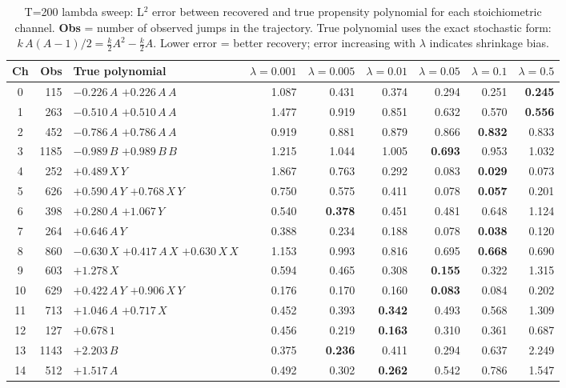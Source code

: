 \begin{table}[htbp]
\centering
\small
\caption{T=200 lambda sweep: L$^2$ error between recovered and true propensity polynomial
for each stoichiometric channel. \textbf{Obs} = number of observed jumps in the trajectory.
True polynomial uses the exact stochastic form: $k\,A(A-1)/2 = \tfrac{k}{2}A^2 - \tfrac{k}{2}A$.
Lower error = better recovery; error increasing with $\lambda$ indicates shrinkage bias.}
\label{tab:sparse_lambda_sweep}
\begin{tabular}{c r l r r r r r r }
\toprule
Ch & Obs & True polynomial & $\lambda=0.001$ & $\lambda=0.005$ & $\lambda=0.01$ & $\lambda=0.05$ & $\lambda=0.1$ & $\lambda=0.5$ \\
\midrule
0 & 115 & $-0.226\,A$ $+0.226\,A\,A$ & 1.087 & 0.431 & 0.374 & 0.294 & 0.251 & \textbf{0.245} \\
1 & 263 & $-0.510\,A$ $+0.510\,A\,A$ & 1.477 & 0.919 & 0.851 & 0.632 & 0.570 & \textbf{0.556} \\
2 & 452 & $-0.786\,A$ $+0.786\,A\,A$ & 0.919 & 0.881 & 0.879 & 0.866 & \textbf{0.832} & 0.833 \\
3 & 1185 & $-0.989\,B$ $+0.989\,B\,B$ & 1.215 & 1.044 & 1.005 & \textbf{0.693} & 0.953 & 1.032 \\
4 & 252 & $+0.489\,X\,Y$ & 1.867 & 0.763 & 0.292 & 0.083 & \textbf{0.029} & 0.073 \\
5 & 626 & $+0.590\,A\,Y$ $+0.768\,X\,Y$ & 0.750 & 0.575 & 0.411 & 0.078 & \textbf{0.057} & 0.201 \\
6 & 398 & $+0.280\,A$ $+1.067\,Y$ & 0.540 & \textbf{0.378} & 0.451 & 0.481 & 0.648 & 1.124 \\
7 & 264 & $+0.646\,A\,Y$ & 0.388 & 0.234 & 0.188 & 0.078 & \textbf{0.038} & 0.120 \\
8 & 860 & $-0.630\,X$ $+0.417\,A\,X$ $+0.630\,X\,X$ & 1.153 & 0.993 & 0.816 & 0.695 & \textbf{0.668} & 0.690 \\
9 & 603 & $+1.278\,X$ & 0.594 & 0.465 & 0.308 & \textbf{0.155} & 0.322 & 1.315 \\
10 & 629 & $+0.422\,A\,Y$ $+0.906\,X\,Y$ & 0.176 & 0.170 & 0.160 & \textbf{0.083} & 0.084 & 0.202 \\
11 & 713 & $+1.046\,A$ $+0.717\,X$ & 0.452 & 0.393 & \textbf{0.342} & 0.493 & 0.568 & 1.309 \\
12 & 127 & $+0.678\,1$ & 0.456 & 0.219 & \textbf{0.163} & 0.310 & 0.361 & 0.687 \\
13 & 1143 & $+2.203\,B$ & 0.375 & \textbf{0.236} & 0.411 & 0.294 & 0.637 & 2.249 \\
14 & 512 & $+1.517\,A$ & 0.492 & 0.302 & \textbf{0.262} & 0.542 & 0.786 & 1.547 \\
\bottomrule
\end{tabular}
\end{table}